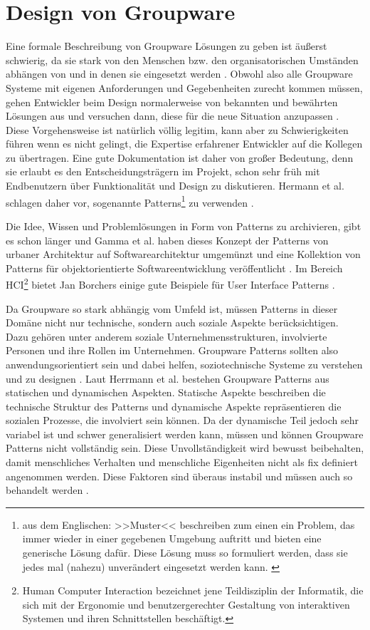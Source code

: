 \section{Design von Groupware}

Eine formale Beschreibung von Groupware Lösungen zu geben ist äußerst schwierig, da sie stark von den Menschen bzw. den organisatorischen Umständen abhängen von und in denen sie eingesetzt werden \citep{Suchman:1995}. Obwohl also alle Groupware Systeme mit eigenen Anforderungen und Gegebenheiten zurecht kommen müssen, gehen Entwickler beim Design normalerweise von bekannten und bewährten Lösungen aus und versuchen dann, diese für die neue Situation anzupassen \citep{Herrmann:2003}. Diese Vorgehensweise ist natürlich völlig legitim, kann aber zu Schwierigkeiten führen wenn es nicht gelingt, die Expertise erfahrener Entwickler auf die Kollegen zu übertragen. Eine gute Dokumentation ist daher von großer Bedeutung, denn sie erlaubt es den Entscheidungsträgern im Projekt, schon sehr früh mit Endbenutzern über Funktionalität und Design zu diskutieren. Hermann et al. schlagen daher vor, sogenannte Patterns\footnote{aus dem Englischen: >>Muster<< beschreiben zum einen ein Problem, das immer wieder in einer gegebenen Umgebung auftritt und bieten eine generische Lösung dafür. Diese Lösung muss so formuliert werden, dass sie jedes mal (nahezu) unverändert eingesetzt werden kann. \citep{Herrmann:2003}} zu verwenden \citep{Herrmann:2003}. 

\medskip Die Idee, Wissen und Problemlösungen in Form von Patterns zu archivieren, gibt es schon länger und Gamma et al. haben dieses Konzept der Patterns von urbaner Architektur auf Softwarearchitektur umgemünzt und eine Kollektion von Patterns für objektorientierte Softwareentwicklung veröffentlicht \citep{Gamma:1995}. Im Bereich HCI\footnote{Human Computer Interaction bezeichnet jene Teildisziplin der Informatik, die sich mit der Ergonomie und benutzergerechter Gestaltung von interaktiven Systemen und ihren Schnittstellen beschäftigt.} bietet Jan Borchers einige gute Beispiele für User Interface Patterns \citep{Borchers:2000}.

\medskip Da Groupware so stark abhängig vom Umfeld ist, müssen Patterns in dieser Domäne nicht nur technische, sondern auch soziale Aspekte berücksichtigen. Dazu gehören unter anderem soziale Unternehmensstrukturen, involvierte Personen und ihre Rollen im Unternehmen. Groupware Patterns sollten also anwendungsorientiert sein und dabei helfen, soziotechnische Systeme zu verstehen und zu designen \citep{Herrmann:2003, Eason:1988}. Laut Herrmann et al. bestehen Groupware Patterns aus statischen und dynamischen Aspekten. Statische Aspekte beschreiben die technische Struktur des Patterns und dynamische Aspekte repräsentieren die sozialen Prozesse, die involviert sein können. Da der dynamische Teil jedoch sehr variabel ist und schwer generalisiert werden kann, müssen und können Groupware Patterns nicht vollständig sein. Diese Unvollständigkeit wird bewusst beibehalten, damit menschliches Verhalten und menschliche Eigenheiten nicht als fix definiert angenommen werden. Diese Faktoren sind überaus instabil und müssen auch so behandelt werden \citep{Herrmann:2003}.

